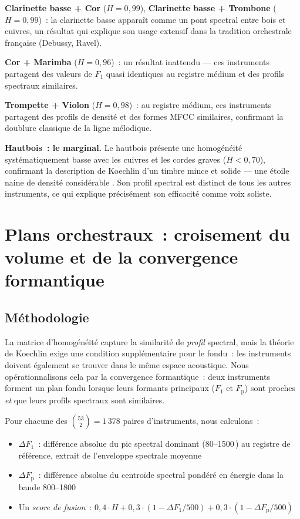 \documentclass[journal]{IEEEtran}
\newcommand{\Fp}{F_\mathrm{p}}
\newcommand{\Hz}{\,\text{Hz}}
\begin{document}
\textbf{Clarinette basse + Cor} ($H = 0{,}99$), \textbf{Clarinette basse + Trombone} ($H = 0{,}99$)~: la clarinette basse apparaît comme un \og pont \fg{} spectral entre bois et cuivres, un résultat qui explique son usage extensif dans la tradition orchestrale française (Debussy, Ravel).

\textbf{Cor + Marimba} ($H = 0{,}96$)~: un résultat inattendu --- ces instruments partagent des valeurs de $F_1$ quasi identiques au registre médium et des profils spectraux similaires.

\textbf{Trompette + Violon} ($H = 0{,}98$)~: au registre médium, ces instruments partagent des profils de densité et des formes MFCC similaires, confirmant la doublure classique de la ligne mélodique.

\textbf{Hautbois~: le marginal.} Le hautbois présente une homogénéité systématiquement basse avec les cuivres et les cordes graves ($H < 0{,}70$), confirmant la description de Koechlin d'un timbre \og mince et solide \fg{} --- une \og étoile naine de densité considérable \fg. Son profil spectral est distinct de tous les autres instruments, ce qui explique précisément son efficacité comme voix soliste.

\section{Plans orchestraux~: croisement du volume et de la convergence formantique}
\label{sec:planes}

\subsection{Méthodologie}

La matrice d'homogénéité capture la similarité de \emph{profil} spectral, mais la théorie de Koechlin exige une condition supplémentaire pour le fondu~: les instruments doivent également se trouver dans le même \og espace \fg{} acoustique. Nous opérationnalisons cela par la convergence formantique~: deux instruments forment un plan fondu lorsque leurs formants principaux ($F_1$ et $\Fp$) sont proches \emph{et} que leurs profils spectraux sont similaires.

Pour chacune des $\binom{53}{2} = 1\,378$ paires d'instruments, nous calculons~:
\begin{itemize}[nosep]
\item $\Delta F_1$~: différence absolue du pic spectral dominant (80--1500\Hz) au registre de référence, extrait de l'enveloppe spectrale moyenne
\item $\Delta \Fp$~: différence absolue du centroïde spectral pondéré en énergie dans la bande 800--1800\Hz
\item Un \textit{score de fusion}~: $0{,}4 \cdot H + 0{,}3 \cdot (1 - \Delta F_1/500) + 0{,}3 \cdot (1 - \Delta\Fp/500)$
\end{itemize}
\end{document}
